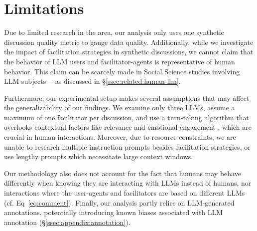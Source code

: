 %
\section{Limitations} 
\label{sec:limitations}

Due to limited research in the area, our analysis only uses one synthetic discussion quality metric to gauge data quality. Additionally, while we investigate the impact of facilitation strategies in synthetic discussions, we cannot claim that the behavior of \ac{LLM} users and facilitator-agents is representative of human behavior. This claim can be scarcely made in Social Science studies involving \ac{LLM} subjects \cite{rossi_2024, zhou-etal-2024-real}—as discussed in \S\ref{ssec:related:human-llm}.

Furthermore, our experimental setup makes several assumptions that may affect the generalizability of our findings. We examine only three \acp{LLM}, assume a maximum of one facilitator per discussion, and use a turn-taking algorithm that overlooks contextual factors like relevance and emotional engagement \cite{robert_2016_comment, Ziegele03102018}, which are crucial in human interactions. Moreover, due to resource constraints, we are unable to research multiple instruction prompts besides facilitation strategies, or use lengthy prompts which necessitate large context windows. 

Our methodology also does not account for the fact that humans may behave differently when knowing they are interacting with \acp{LLM} instead of humans, nor interactions where the user-agents and facilitators are based on different \acp{LLM} (cf. Eq~\ref{eq:comment}). Finally, our analysis partly relies on \ac{LLM}-generated annotations, potentially introducing known biases associated with \ac{LLM} annotation (\S\ref{ssec:appendix:annotation}).